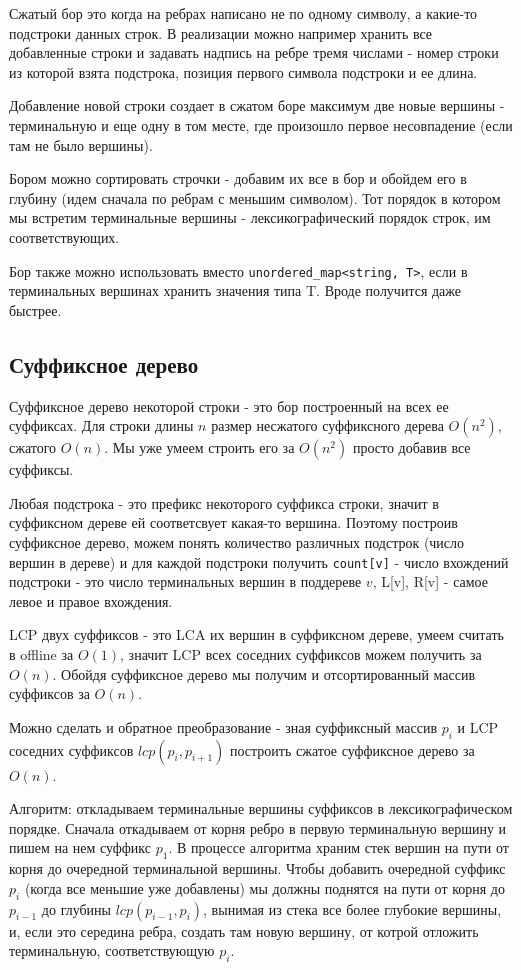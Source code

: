 Сжатый бор это когда на ребрах написано не по одному символу, а какие-то подстроки данных строк.  
В реализации можно например хранить все добавленные строки и задавать надпись на ребре тремя числами - номер строки из которой взята подстрока, позиция первого символа подстроки и ее длина.

Добавление новой строки создает в сжатом боре максимум две новые вершины - терминальную и еще одну в том месте, где произошло первое несовпадение (если там не было вершины).

Бором можно сортировать строчки - добавим их все в бор и обойдем его в глубину (идем сначала по ребрам с меньшим символом). Тот порядок в котором мы встретим терминальные вершины - лексикографический порядок строк, им соответствующих.

Бор также можно использовать вместо \texttt{unordered\_map<string, T>}, если в терминальных вершинах хранить значения типа T. Вроде получится даже быстрее.

\subsection{Суффиксное дерево}

Суффиксное дерево некоторой строки - это бор построенный на всех ее суффиксах. Для строки длины $n$ размер несжатого суффиксного дерева $O(n^2)$, сжатого $O(n)$. Мы уже умеем строить его за $O(n^2)$ просто добавив все суффиксы.

Любая подстрока - это префикс некоторого суффикса строки, значит в суффиксном дереве ей соответсвует какая-то вершина. Поэтому построив суффиксное дерево, можем понять количество различных подстрок (число вершин в дереве) и для каждой подстроки получить
\texttt{count[v]} - число вхождений подстроки - это число терминальных вершин в поддереве $v$, L[v], R[v] - самое левое и правое вхождения.

LCP двух суффиксов - это LCA их вершин в суффиксном дереве, умеем считать в offline  за $O(1)$, значит LCP всех соседних суффиксов можем получить за $O(n)$. Обойдя суффиксное дерево мы получим и отсортированный массив суффиксов за $O(n)$.

Можно сделать и обратное преобразование - зная суффиксный массив $p_i$ и LCP соседних суффиксов $lcp(p_i, p_{i + 1})$ построить сжатое суффиксное дерево за $O(n)$.

Алгоритм: откладываем терминальные вершины суффиксов в лексикографическом порядке. Сначала откадываем от корня ребро в первую терминальную вершину и пишем на нем суффикс $p_1$. В процессе алгоритма храним стек вершин на пути от корня до очередной терминальной вершины. Чтобы добавить очередной суффикс $p_i$ (когда все меньшие уже добавлены) мы должны поднятся на пути от корня до $p_{i - 1}$ до глубины $lcp(p_{i - 1}, p_i)$, вынимая из стека все более глубокие вершины, и, если это середина ребра, создать там новую вершину, от котрой отложить терминальную, соответствующую $p_i$.

